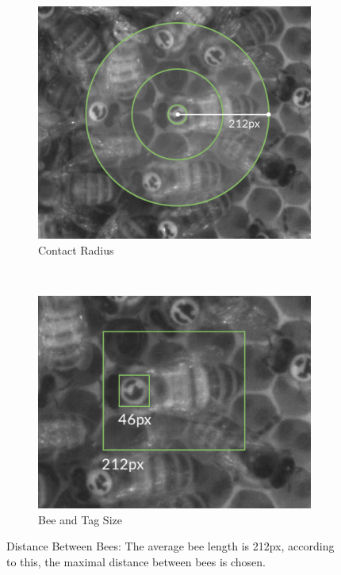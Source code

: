 \begin{figure}
    \centering
    \begin{subfigure}[b]{0.45\textwidth}
		\centering
		\includegraphics[width=\textwidth]{Figures/radius}
		\caption[Contact Radius]{Contact Radius}
		\label{fig:radius}
    \end{subfigure}
    ~ %
    \begin{subfigure}[b]{0.45\textwidth}
	    \includegraphics[width=\textwidth]{Figures/sizeTagBee}
        \caption[Bee and Tag Size]{Bee and Tag Size}
        \label{fig:size}
    \end{subfigure}
    \caption{Distance Between Bees: The average bee length is 212px, according to this, the maximal distance between bees is chosen.}
    \label{fig:contactRadius}
\end{figure}

